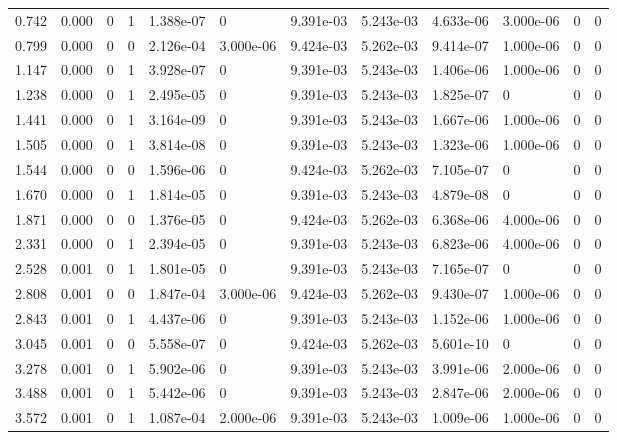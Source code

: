 \documentclass[preview]{standalone}
\begin{document}
{{\begin{tabular}{L{1.2cm}C{1.2cm} C{0.3cm}C{0.5cm} C{1.4cm}C{1.4cm} C{1.4cm}C{1.4cm} C{1.6cm}C{1.6cm} C{1.6cm}C{1.6cm}}
  0.742  &  0.000  & 0     &  1 &  1.388e-07  & 0  &  9.391e-03&   5.243e-03& 4.633e-06 & 3.000e-06   &  0 & 0  \\ 
  0.799  &  0.000  & 0     &  0 &  2.126e-04  & 3.000e-06  &  9.424e-03&   5.262e-03& 9.414e-07 & 1.000e-06   &  0 & 0  \\ 
  1.147  &  0.000  & 0     &  1 &  3.928e-07  & 0  &  9.391e-03&   5.243e-03& 1.406e-06 & 1.000e-06   &  0 & 0  \\ 
  1.238  &  0.000  & 0     &  1 &  2.495e-05  & 0  &  9.391e-03&   5.243e-03& 1.825e-07 & 0   &  0 & 0  \\ 
  1.441  &  0.000  & 0     &  1 &  3.164e-09  & 0  &  9.391e-03&   5.243e-03& 1.667e-06 & 1.000e-06   &  0 & 0  \\ 
  1.505  &  0.000  & 0     &  1 &  3.814e-08  & 0  &  9.391e-03&   5.243e-03& 1.323e-06 & 1.000e-06   &  0 & 0  \\ 
  1.544  &  0.000  & 0     &  0 &  1.596e-06  & 0  &  9.424e-03&   5.262e-03& 7.105e-07 & 0   &  0 & 0  \\ 
  1.670  &  0.000  & 0     &  1 &  1.814e-05  & 0  &  9.391e-03&   5.243e-03& 4.879e-08 & 0   &  0 & 0  \\ 
  1.871  &  0.000  & 0     &  0 &  1.376e-05  & 0  &  9.424e-03&   5.262e-03& 6.368e-06 & 4.000e-06   &  0 & 0  \\ 
  2.331  &  0.000  & 0     &  1 &  2.394e-05  & 0  &  9.391e-03&   5.243e-03& 6.823e-06 & 4.000e-06   &  0 & 0  \\ 
  2.528  &  0.001  & 0     &  1 &  1.801e-05  & 0  &  9.391e-03&   5.243e-03& 7.165e-07 & 0   &  0 & 0  \\ 
  2.808  &  0.001  & 0     &  0 &  1.847e-04  & 3.000e-06  &  9.424e-03&   5.262e-03& 9.430e-07 & 1.000e-06   &  0 & 0  \\ 
  2.843  &  0.001  & 0     &  1 &  4.437e-06  & 0  &  9.391e-03&   5.243e-03& 1.152e-06 & 1.000e-06   &  0 & 0  \\ 
  3.045  &  0.001  & 0     &  0 &  5.558e-07  & 0  &  9.424e-03&   5.262e-03& 5.601e-10 & 0   &  0 & 0  \\ 
  3.278  &  0.001  & 0     &  1 &  5.902e-06  & 0  &  9.391e-03&   5.243e-03& 3.991e-06 & 2.000e-06   &  0 & 0  \\ 
  3.488  &  0.001  & 0     &  1 &  5.442e-06  & 0  &  9.391e-03&   5.243e-03& 2.847e-06 & 2.000e-06   &  0 & 0  \\ 
  3.572  &  0.001  & 0     &  1 &  1.087e-04  & 2.000e-06  &  9.391e-03&   5.243e-03& 1.009e-06 & 1.000e-06   &  0 & 0  \\ 

\end{tabular}}}
\end{document}
